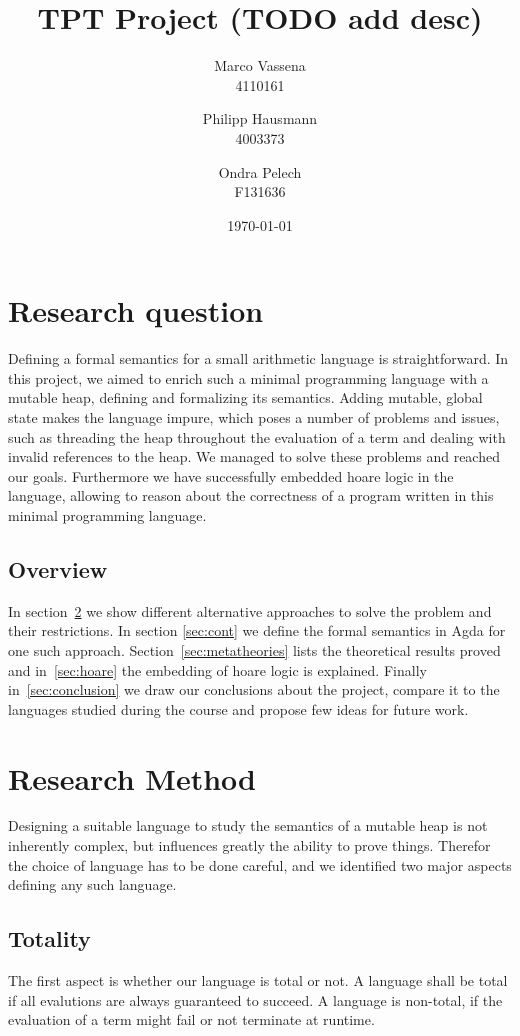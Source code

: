 \documentclass[12pt, a4paper, oneside]{article}
\title{TPT Project (TODO add desc)}
\author{Marco Vassena  \\
    4110161 \\
    \and
    Philipp Hausmann \\
    4003373 \\
    \and
    Ondra Pelech \\
    F131636 \\
    }
\date{\today}
\begin{document}
\maketitle

\tableofcontents


\section{Research question}
Defining a formal semantics for a small arithmetic language is straightforward. In this project, we aimed to enrich such a minimal programming language with a mutable heap, defining and formalizing its semantics. Adding mutable, global state makes the language impure, which  poses a number of problems and issues, such as threading the heap throughout the evaluation of a term and dealing with invalid references to the heap. 
We managed to solve these problems and reached our goals. Furthermore we have successfully embedded hoare logic in the language, allowing to reason about the correctness of a program written in this minimal programming language.

\subsection{Overview}
In section~\ref{sec:method} we show different alternative approaches to solve the problem and their restrictions. 
In section \ref{sec:cont} we define the formal semantics in Agda for one such approach.
Section~\ref{sec:metatheories} lists the theoretical results proved and in~\ref{sec:hoare} the embedding of hoare logic is explained.
Finally in~\ref{sec:conclusion} we draw our conclusions about the project, compare it to the languages studied during the course and propose few ideas for future work.

\section{Research Method}
\label{sec:method}
Designing a suitable language to study the semantics of a mutable heap is not inherently complex, but influences greatly
the ability to prove things. Therefor the choice of language has to be done careful, and we identified two
major aspects defining any such language.

\subsection{Totality}
The first aspect is whether our language is total or not. A language shall be total if all evalutions
are always guaranteed to succeed. A language is non-total, if the evaluation of a term might fail or not terminate at runtime.
\end{document}
